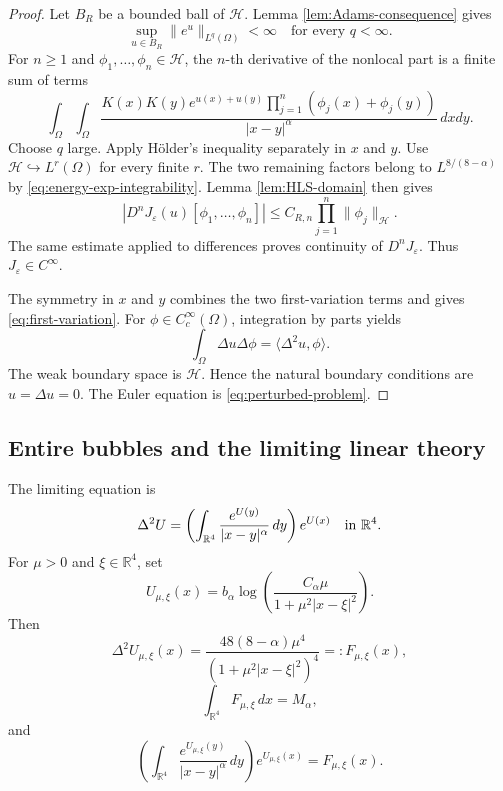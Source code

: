 \documentclass[11pt]{article}
\numberwithin{equation}{section}
\begin{document}
\begin{proof}
Let $B_R$ be a bounded ball of $\mathcal H$. Lemma
\ref{lem:Adams-consequence} gives
\begin{equation}\label{eq:energy-exp-integrability}
\sup_{u\in B_R}\|e^u\|_{L^q(\Omega)}<\infty
\quad\text{for every }q<\infty.
\end{equation}
For $n\geq1$ and $\phi_1,\ldots,\phi_n\in\mathcal H$, the $n$-th
derivative of the nonlocal part is a finite sum of terms
\begin{equation*}
\int_\Omega\int_\Omega
\frac{K(x)K(y)e^{u(x)+u(y)}
\prod_{j=1}^n(\phi_j(x)+\phi_j(y))}
{|x-y|^\alpha}\,dxdy.
\end{equation*}
Choose $q$ large. Apply H\"older's inequality separately in $x$ and
$y$. Use $\mathcal H\hookrightarrow L^r(\Omega)$ for every finite
$r$. The two remaining factors belong to $L^{8/(8-\alpha)}$ by
\eqref{eq:energy-exp-integrability}. Lemma \ref{lem:HLS-domain} then
gives
\begin{equation*}
|D^nJ_\varepsilon(u)[\phi_1,\ldots,\phi_n]|
\leq C_{R,n}\prod_{j=1}^n\|\phi_j\|_{\mathcal H}.
\end{equation*}
The same estimate applied to differences proves continuity of
$D^nJ_\varepsilon$. Thus $J_\varepsilon\in C^\infty$.

The symmetry in $x$ and $y$ combines the two first-variation terms
and gives \eqref{eq:first-variation}. For
$\phi\in C_c^\infty(\Omega)$, integration by parts yields
\[
\int_\Omega\Delta u\Delta\phi
=\langle\Delta^2u,\phi\rangle.
\]
The weak boundary space is $\mathcal H$. Hence the natural boundary
conditions are $u=\Delta u=0$. The Euler equation is
\eqref{eq:perturbed-problem}.
\end{proof}

\subsection{Entire bubbles and the limiting linear theory}

The limiting equation is
\begin{equation*}
\Delta^2U=
\left(\int_{\mathbb R^4}\frac{e^{U(y)}}{|x-y|^\alpha}\,dy\right)e^{U(x)}
\quad\hbox{in }\mathbb R^4.
\end{equation*}
For $\mu>0$ and $\xi\in\mathbb R^4$, set
\begin{equation*}
U_{\mu,\xi}(x)
=b_\alpha\log\left(
\frac{C_\alpha\mu}{1+\mu^2|x-\xi|^2}\right).
\end{equation*}
Then
\begin{equation*}
\Delta^2U_{\mu,\xi}(x)
=\frac{48(8-\alpha)\mu^4}{(1+\mu^2|x-\xi|^2)^4}
=:F_{\mu,\xi}(x),
\end{equation*}
\begin{equation}\label{eq:bubble-mass}
\int_{\mathbb R^4}F_{\mu,\xi}\,dx=M_\alpha,
\end{equation}
and
\begin{equation}\label{eq:bubble-nonlocal}
\left(\int_{\mathbb R^4}
\frac{e^{U_{\mu,\xi}(y)}}{|x-y|^\alpha}\,dy\right)e^{U_{\mu,\xi}(x)}
=F_{\mu,\xi}(x).
\end{equation}
\end{document}
